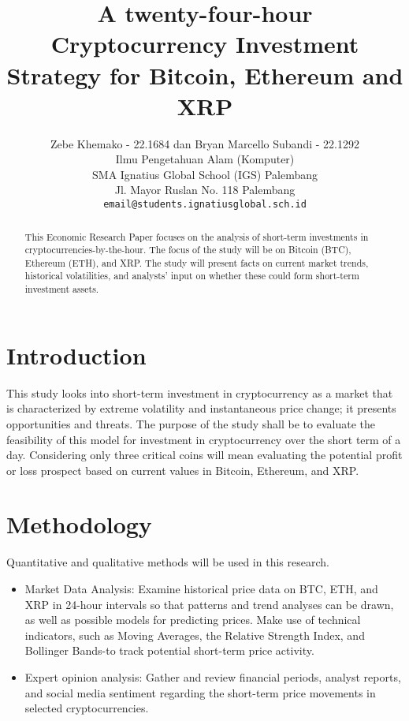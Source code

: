 \documentclass[12pt, a4paper]{article}
\title{\Huge\textbf{A twenty-four-hour Cryptocurrency Investment Strategy for Bitcoin, Ethereum and XRP}}
\author{Zebe Khemako - 22.1684 dan Bryan Marcello Subandi - 22.1292 \\
        Ilmu Pengetahuan Alam (Komputer) \\
        SMA Ignatius Global School (IGS) Palembang \\
        Jl. Mayor Ruslan No. 118 Palembang \\
        \texttt{email@students.ignatiusglobal.sch.id}}
\date{}
\begin{document}
\maketitle

\begin{abstract}
    This Economic Research Paper focuses on the analysis of short-term investments in cryptocurrencies-by-the-hour. The focus of the study will be on Bitcoin (BTC), Ethereum (ETH), and XRP. The study will present facts on current market trends, historical volatilities, and analysts' input on whether these could form short-term investment assets. 
\end{abstract}

\section{Introduction}
This study looks into short-term investment in cryptocurrency as a market that is characterized by extreme volatility and instantaneous price change; it presents opportunities and threats. The purpose of the study shall be to evaluate the feasibility of this model for investment in cryptocurrency over the short term of a day. Considering only three critical coins will mean evaluating the potential profit or loss prospect based on current values in Bitcoin, Ethereum, and XRP.

\section{Methodology}

Quantitative and qualitative methods will be used in this research.
\begin{itemize}
    \item Market Data Analysis: Examine historical price data on BTC, ETH, and XRP in 24-hour intervals so that patterns and trend analyses can be drawn, as well as possible models for predicting prices. Make use of technical indicators, such as Moving Averages, the Relative Strength Index, and Bollinger Bands-to track potential short-term price activity.

    \item Expert opinion analysis: Gather and review financial periods, analyst reports, and social media sentiment regarding the short-term price movements in selected cryptocurrencies.
\end{itemize}
\end{document}
